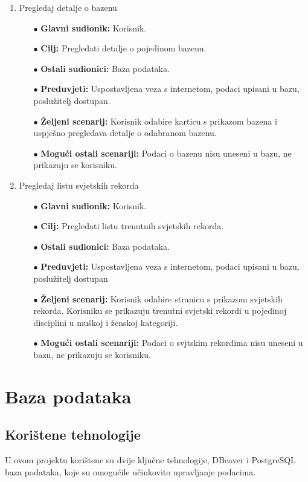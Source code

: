 \documentclass[times, utf8, zavrsni]{fer}
\begin{document}
\begin{enumerate}
    \item Pregledaj detalje o bazenu
    \begin{itemize}
        \item[$\bullet$] \textbf{Glavni sudionik:} Korisnik.
        \item[$\bullet$] \textbf{Cilj:} Pregledati detalje o pojedinom bazenu.
        \item[$\bullet$] \textbf{Ostali sudionici:} Baza podataka.
        \item[$\bullet$] \textbf{Preduvjeti:} Uspostavljena veza s internetom, podaci upisani u bazu, poslužitelj dostupan.
        \item[$\bullet$] \textbf{Željeni scenarij:} Korisnik odabire karticu s prikazom bazena i uspješno pregledava detalje o odabranom bazenu.
        \item[$\bullet$] \textbf{Mogući ostali scenariji:} Podaci o bazenu nisu uneseni u bazu, ne prikazuju se korisniku.
    \end{itemize}

    \item Pregledaj listu svjetskih rekorda
    \begin{itemize}
        \item[$\bullet$] \textbf{Glavni sudionik:} Korisnik.
        \item[$\bullet$] \textbf{Cilj:} Pregledati listu trenutnih svjetskih rekorda.
        \item[$\bullet$] \textbf{Ostali sudionici:} Baza podataka.
        \item[$\bullet$] \textbf{Preduvjeti:} Uspostavljena veza s internetom, podaci upisani u bazu, poslužitelj dostupan
        \item[$\bullet$] \textbf{Željeni scenarij:} Korisnik odabire stranicu s prikazom svjetskih rekorda. Korisniku se prikazuju trenutni svjetski rekordi
        u pojedinoj disciplini u muškoj i ženskoj kategoriji.
        \item[$\bullet$] \textbf{Mogući ostali scenariji:} Podaci o svjtskim rekordima nisu uneseni u bazu, ne prikazuju se korisniku.
    \end{itemize}

\end{enumerate}

\chapter{Baza podataka}

\section{Korištene tehnologije}
U ovom projektu korištene su dvije ključne tehnologije, DBeaver i PostgreSQL baza podataka, koje su omogućile
učinkovito upravljanje podacima.
\end{document}
